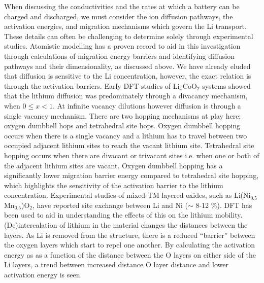\documentclass[../main.tex]{subfiles}
\begin{document}
When discussing the conductivities and the rates at which a battery can be charged and discharged, we must consider the ion diffusion pathways, the activation energies, and migration mechanisms which govern the Li transport. These details can often be challenging to determine solely through experimental studies. Atomistic modelling has a proven record to aid in this investigation through calculations of migration energy barriers and identifying diffusion pathways and their dimensionality, as discussed above. We have already eluded that diffusion is sensitive to the Li concentration, however, the exact relation is through the activation barriers. Early DFT studies \cite{van2000lithium,van2001lithium} of Li$_x$CoO$_2$ systems showed that the lithium diffusion was predominately through a divacancy mechanism, when $0\leq x < 1$. At infinite vacancy dilutions however diffusion is through a single vacancy mechanism. \cite{islam2014lithium} There are two hopping mechanisms at play here; oxygen dumbbell hops and tetrahedral site hops. Oxygen dumbbell hopping occurs when there is a single vacancy and a lithium has to travel between two occupied adjacent lithium sites to reach the vacant lithium site. Tetrahedral site hopping occurs when there are divacant or trivacant sites i.e.  when one or both of the adjacent lithium sites are vacant. \cite{van2001lithium} Oxygen dumbbell hopping has a significantly lower migration barrier energy compared to tetrahedral site hopping, which highlights the sensitivity of the activation barrier to the lithium concentration. Experimental studies of mixed-TM layered oxides, such as Li(Ni$_{0.5}$Mn$_{0.5}$)O$_2$, have reported site exchange between Li and Ni ($\sim$ 8-12 \%). \cite{choi2005structural} DFT has been used to aid in understanding the effects of this on the lithium mobility. \cite{kang2006electrodes,laubach2009structure} (De)intercalation of lithium in the material changes the distances between the layers. As Li is removed from the structure, there is a reduced ``barrier'' between the oxygen layers which start to repel one another. By calculating the activation energy as as a function of the distance between the O layers on either side of the Li layers, a trend between increased distance O layer distance and lower activation energy is seen. \cite{kang2006electrodes,laubach2009structure}
\end{document}
